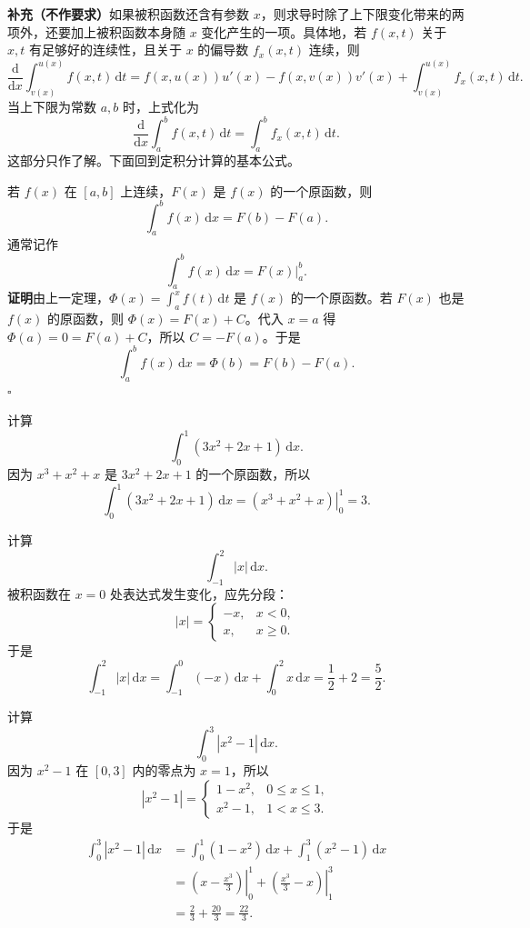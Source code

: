 \documentclass[fontset=fandol]{ctexart}
\newcommand{\dd}{\mathrm{d}}
\begin{document}
\noindent\textbf{补充（不作要求）}\quad 如果被积函数还含有参数 $x$，则求导时除了上下限变化带来的两项外，还要加上被积函数本身随 $x$ 变化产生的一项。具体地，若 $f(x,t)$ 关于 $x,t$ 有足够好的连续性，且关于 $x$ 的偏导数 $f_x(x,t)$ 连续，则
\[
\frac{\dd}{\dd x}\int_{v(x)}^{u(x)}f(x,t)\,\dd t
=f(x,u(x))u'(x)-f(x,v(x))v'(x)
+\int_{v(x)}^{u(x)}f_x(x,t)\,\dd t.
\]
当上下限为常数 $a,b$ 时，上式化为
\[
\frac{\dd}{\dd x}\int_a^b f(x,t)\,\dd t
=\int_a^b f_x(x,t)\,\dd t.
\]
这部分只作了解。下面回到定积分计算的基本公式。

\begin{theorem}
若 $f(x)$ 在 $[a,b]$ 上连续，$F(x)$ 是 $f(x)$ 的一个原函数，则
\[
\int_a^b f(x)\,\dd x=F(b)-F(a).
\]
通常记作
\[
\int_a^b f(x)\,\dd x=\left.F(x)\right|_a^b.
\]
\textbf{证明}\quad 由上一定理，$\Phi(x)=\int_a^x f(t)\,\dd t$ 是 $f(x)$ 的一个原函数。若 $F(x)$ 也是 $f(x)$ 的原函数，则 $\Phi(x)=F(x)+C$。代入 $x=a$ 得 $\Phi(a)=0=F(a)+C$，所以 $C=-F(a)$。于是
\[
\int_a^b f(x)\,\dd x=\Phi(b)=F(b)-F(a).
\]
\noindent\hfill$\square$
\end{theorem}

\begin{example}[直接计算]
计算
\[
\int_0^1(3x^2+2x+1)\,\dd x.
\]
因为 $x^3+x^2+x$ 是 $3x^2+2x+1$ 的一个原函数，所以
\[
\int_0^1(3x^2+2x+1)\,\dd x
=\left.(x^3+x^2+x)\right|_0^1=3.
\]
\end{example}

\begin{example}[含绝对值的定积分]
计算
\[
\int_{-1}^{2}|x|\,\dd x.
\]
被积函数在 $x=0$ 处表达式发生变化，应先分段：
\[
|x|=
\begin{cases}
-x,&x<0,\\
x,&x\geq0.
\end{cases}
\]
于是
\[
\int_{-1}^{2}|x|\,\dd x
=\int_{-1}^0(-x)\,\dd x+\int_0^2x\,\dd x
=\frac12+2=\frac52.
\]
\end{example}

\begin{example}
计算
\[
\int_0^3 |x^2-1|\,\dd x.
\]
因为 $x^2-1$ 在 $[0,3]$ 内的零点为 $x=1$，所以
\[
|x^2-1|=
\begin{cases}
1-x^2,&0\leq x\leq1,\\
x^2-1,&1<x\leq3.
\end{cases}
\]
于是
\[
\begin{aligned}
\int_0^3 |x^2-1|\,\dd x
&=\int_0^1(1-x^2)\,\dd x+\int_1^3(x^2-1)\,\dd x\\
&=\left.\left(x-\frac{x^3}{3}\right)\right|_0^1
+\left.\left(\frac{x^3}{3}-x\right)\right|_1^3\\
&=\frac23+\frac{20}{3}=\frac{22}{3}.
\end{aligned}
\]
\end{example}
\end{document}
